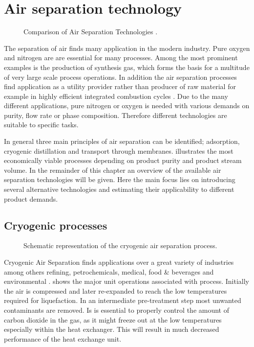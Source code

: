 \chapter{Air separation technology}
\label{chp:airsep}
\begin{figure}[h]
	
	\caption{Comparison of Air Separation Technologies \cite{Prasad.1994}.}
	\label{fig:tech_compar}
\end{figure}
The separation of air finds many application in the modern industry. Pure oxygen and nitrogen are
are essential for many processes. Among the most prominent examples is the production of synthesis gas,
which forms the basis for a multitude of very large scale process operations. In addition the
air separation processes find application as a utility provider rather than producer of raw material
for example in highly efficient integrated combustion cycles \cite{Mahapatra.2010}. Due to the
many different applications, pure nitrogen or oxygen is needed with various demands on
purity, flow rate or phase composition. Therefore different technologies are suitable to specific tasks.

In general three main principles of air separation can be identified; adsorption,
cryogenic distillation and transport through membranes. illustrates the most
economically viable processes depending on product purity and product stream volume.
In the remainder of this chapter an overview of the available air separation technologies
will be given. Here the main focus lies on introducing several alternative technologies
and estimating their applicability to different product demands.

    \section{Cryogenic processes}
    \label{sec:cryo_air_sep}
    \begin{figure}
        \center
        
        \caption[Air Separation Unit]{Schematic representation of the cryogenic air separation process.}
        \label{fig:ASU}
    \end{figure}
    Cryogenic Air Separation finds applications over a great variety of industries among others refining,
    petrochemicals, medical, food \& beverages and environmental \cite{Sirdeshpande.2005}. 
    shows the major unit operations associated with process. Initially the air is compressed and later re-expanded
    to reach the low temperatures required for liquefaction. In an intermediate pre-treatment step most unwanted
    contaminants are removed. Is is essential to properly control the amount of carbon dioxide in the
    gas, as it might freeze out at the low temperatures especially within the heat exchanger. This will result in
    much decreased performance of the heat exchange unit.

